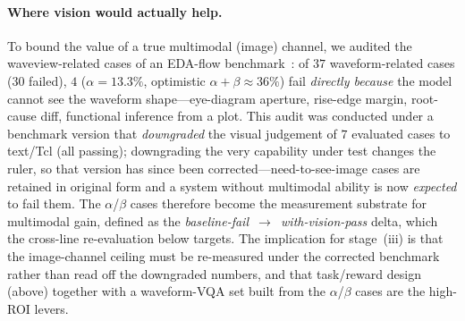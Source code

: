 \paragraph{Where vision would actually help.}
To bound the value of a true multimodal (image) channel, we audited the waveview-related cases of an EDA-flow benchmark~\cite{liu2026zhulong}: of $37$ waveform-related cases ($30$ failed), $4$ ($\alpha{=}13.3\%$, optimistic $\alpha{+}\beta{\approx}36\%$) fail \emph{directly because} the model cannot see the waveform shape---eye-diagram aperture, rise-edge margin, root-cause diff, functional inference from a plot. This audit was conducted under a benchmark version that \emph{downgraded} the visual judgement of $7$ evaluated cases to text/Tcl (all passing); downgrading the very capability under test changes the ruler, so that version has since been corrected---need-to-see-image cases are retained in original form and a system without multimodal ability is now \emph{expected} to fail them. The $\alpha$/$\beta$ cases therefore become the measurement substrate for multimodal gain, defined as the \emph{baseline-fail~$\to$~with-vision-pass} delta, which the cross-line re-evaluation below targets. The implication for stage~(iii) is that the image-channel ceiling must be re-measured under the corrected benchmark rather than read off the downgraded numbers, and that task/reward design (above) together with a waveform-VQA set built from the $\alpha$/$\beta$ cases are the high-ROI levers.

